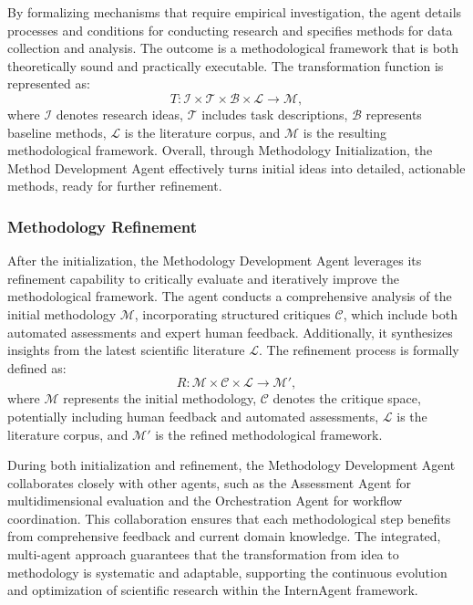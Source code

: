 By formalizing mechanisms that require empirical investigation, the agent details processes and conditions for conducting research and specifies methods for data collection and analysis. The outcome is a methodological framework that is both theoretically sound and practically executable. The transformation function is represented as:
\begin{equation}
    T: \mathcal{I} \times \mathcal{T} \times \mathcal{B} \times \mathcal{L} \rightarrow \mathcal{M},
\end{equation}
where $\mathcal{I}$ denotes research ideas, $\mathcal{T}$ includes task descriptions, $\mathcal{B}$ represents baseline methods, $\mathcal{L}$ is the literature corpus, and $\mathcal{M}$ is the resulting methodological framework.
Overall, through Methodology Initialization, the Method Development Agent effectively turns initial ideas into detailed, actionable methods, ready for further refinement.

\subsubsection{Methodology Refinement}

After the initialization, the Methodology Development Agent leverages its refinement capability to critically evaluate and iteratively improve the methodological framework. The agent conducts a comprehensive analysis of the initial methodology $\mathcal{M}$, incorporating structured critiques $\mathcal{C}$, which include both automated assessments and expert human feedback. Additionally, it synthesizes insights from the latest scientific literature $\mathcal{L}$. The refinement process is formally defined as:
\begin{equation}
    R: \mathcal{M} \times \mathcal{C} \times \mathcal{L} \rightarrow \mathcal{M}',
\end{equation}
where $\mathcal{M}$ represents the initial methodology, $\mathcal{C}$ denotes the critique space, potentially including human feedback and automated assessments, $\mathcal{L}$ is the literature corpus, and $\mathcal{M}'$ is the refined methodological framework.

During both initialization and refinement, the Methodology Development Agent collaborates closely with other agents, such as the Assessment Agent for multidimensional evaluation and the Orchestration Agent for workflow coordination. This collaboration ensures that each methodological step benefits from comprehensive feedback and current domain knowledge. The integrated, multi-agent approach guarantees that the transformation from idea to methodology is systematic and adaptable, supporting the continuous evolution and optimization of scientific research within the InternAgent framework.


